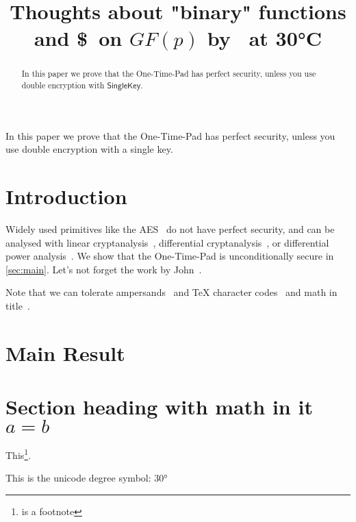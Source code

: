 \documentclass[journal=cic,version=final]{iacrj}
\title[running={Thoughts on binary functions},
  plaintext={Thoughts about "binary" functions and \$\ on $GF(p)$ by Fester Bestertester at 30°C}]{%
  Thoughts about "binary" functions and \$\ on $GF(p)$ by \niceguy\ at 30°C}
\begin{document}
\maketitle

\begin{abstract}
  In this paper we prove that the One-Time-Pad has perfect security, unless you use
  double encryption with {$\mathsf{SingleKey}$}.

  \lipsum[8]
\end{abstract}
\begin{textabstract}
In this paper we prove that the One-Time-Pad has perfect security, unless you use
double encryption with a single key.
\end{textabstract}


\section{Introduction}

Widely used primitives like the AES~\cite{AES} do not have perfect
security, and can be analysed with linear
cryptanalysis~\cite{EC:Matsui93}, differential
cryptanalysis~\cite{JC:BihSha91}, or differential power
analysis~\cite{C:KocJafJun99}.  We show that the One-Time-Pad is
unconditionally secure in \autoref{sec:main}. Let's not forget
the work by John~\cite{vonNeumann}.

Note that we can tolerate ampersands~\cite{Dalheimer02} and \TeX
character codes~\cite{Bohme10} and math in
title~\cite{ACISP:MurPla19,ACISP:LYLF19,ACISP:WeiSteSha03,CCS:BHKNRS19,ACNS:DurHugVau20}.

\lipsum[9]

\section{Main Result}\label{sec:main}

\lipsum

\section{Section heading with math in it $a=b$}
\lipsum

This\footnote{is a footnote}.

This is the unicode degree symbol: 30°


\end{document}
